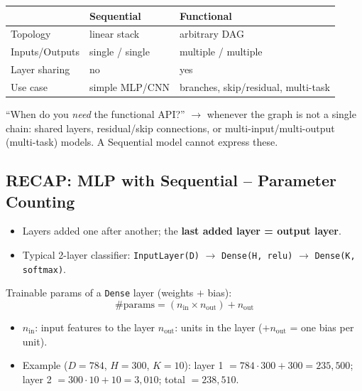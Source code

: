 \documentclass[10pt,a4paper]{article}
\begin{document}
	\begin{center}
		\begin{tabular}{@{}lll@{}}
			\toprule
			& \textbf{Sequential} & \textbf{Functional} \\
			\midrule
			Topology      & linear stack        & arbitrary DAG \\
			Inputs/Outputs & single / single    & multiple / multiple \\
			Layer sharing & no                  & yes \\
			Use case      & simple MLP/CNN      & branches, skip/residual, multi-task \\
			\bottomrule
		\end{tabular}
	\end{center}

	\begin{examtipbox}
		``When do you \emph{need} the functional API?'' $\to$ whenever the graph is not a single chain: shared layers, residual/skip connections, or multi-input/multi-output (multi-task) models. A Sequential model cannot express these.
	\end{examtipbox}

	\subsection{RECAP: MLP with Sequential -- Parameter Counting}

	\begin{itemize}[leftmargin=*]
		\item Layers added one after another; the \textbf{last added layer = output layer}.
		\item Typical 2-layer classifier: \texttt{InputLayer(D)} $\to$ \texttt{Dense(H, relu)} $\to$ \texttt{Dense(K, softmax)}.
	\end{itemize}

	\begin{formulabox}
		Trainable params of a \texttt{Dense} layer (weights $+$ bias):
		\[
		\#\text{params} = (n_{\text{in}} \times n_{\text{out}}) + n_{\text{out}}
		\]
	\end{formulabox}
	\begin{itemize}[leftmargin=*]
		\item $n_{\text{in}}$: input features to the layer \quad $n_{\text{out}}$: units in the layer ($+n_{\text{out}}$ = one bias per unit).
		\item Example ($D=784$, $H=300$, $K=10$): layer 1 $=784\cdot300+300=235{,}500$; layer 2 $=300\cdot10+10=3{,}010$; total $=238{,}510$.
	\end{itemize}
\end{document}
